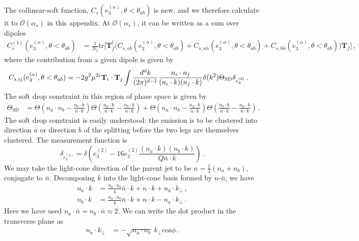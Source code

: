 \documentclass[a4paper,11pt]{article}
\newcommand{\nbar}{{\bar n}}
\newcommand{\ecf}[2]{e_{#1}^{(#2)}}
\def\nbar{\bar n}
\begin{document}
The collinear-soft function, $C_s(\ecf{3}{\alpha},\theta<\theta_{ab})$ is new, and we therefore calculate it to $\mathcal{O}(\alpha_s)$ in this appendix. At $\mathcal{O}(\alpha_s)$, it can be written as a sum over dipoles
{\small\begin{align}
C^{(1)}_{s}(\ecf{3}{\alpha},\theta<\theta_{ab})&=\frac{1}{N_f}\text{tr}\Big[\mathbf{T}_f^{\dagger}\Big(C_{s, ab}(\ecf{3}{\alpha},\theta<\theta_{ab})+C_{s, a\nbar}(\ecf{3}{\alpha},\theta<\theta_{ab})+C_{s, b\nbar}(\ecf{3}{\alpha},\theta<\theta_{ab})\Big)\mathbf{T}_f\Big]\,,
\end{align}}
where the contribution from a given dipole is given by
{\small\begin{align}
C_{s, ij}(\ecf{3}{\alpha},\theta<\theta_{ab}) &= -2g^2\mu^{2\epsilon}{\bf T}_i\cdot {\bf T}_j \int\frac{d^dk}{(2\pi)^{d-1}}\frac{n_i\cdot n_j}{(n_i\cdot k)(n_j\cdot k)}\delta(k^2) \Theta_\text{SD}\delta_{\ecf{3}{2}}\,.
\end{align}}
The soft drop constraint in this region of phase space is given by
{\small\begin{align}\label{eq:two_prong_soft_drop_clustered}
\Theta_\text{SD} &= \Theta\left(n_a\cdot n_b-\frac{n_b\cdot k}{\nbar\cdot k}\right)\Theta\left(\frac{n_a\cdot k}{\nbar\cdot k}-\frac{n_b\cdot k}{\nbar\cdot k}\right)+\Theta\left(n_a\cdot n_b-\frac{n_a\cdot k}{\nbar\cdot k}\right)\Theta\left(\frac{n_b\cdot k}{\nbar\cdot k}-\frac{n_a\cdot k}{\nbar\cdot k}\right)\,.
\end{align}}
The soft drop constraint is easily understood: the emission is to be clustered into direction $a$ or direction $b$ of the splitting before the two legs are themselves clustered. The measurement function is
\begin{equation}
\delta_{\ecf{3}{2}} = \delta\left(
\ecf{3}{2} - 16\ecf{2}{2}\frac{(n_a\cdot k)(n_b\cdot k)}{Q\nbar\cdot k }
\right)\,.
\end{equation}
We may take the light-cone direction of the parent jet to be $n=\frac{1}{2}(n_{a}+n_{b})$, conjugate to $\nbar$. Decomposing $k$ into the light-cone basis formed by $n$-$\nbar$, we have
\begin{align}
n_{a}\cdot k &=\frac{n_a\cdot n_b}{4}\nbar\cdot k+n\cdot k+n_a\cdot k_\perp\,,\\
n_{b}\cdot k &=\frac{n_a\cdot n_b}{4}\nbar\cdot k+n\cdot k-n_a\cdot k_\perp\,.
\end{align}
Here we have used $n_a\cdot\nbar=n_b\cdot\nbar\approx 2$. We can write the dot product in the transverse plane as
\begin{align}
n_a\cdot k_\perp&=-\sqrt{n_a\cdot n_b}~k_\perp\text{cos}\phi\,.
\end{align} 
\end{document}
